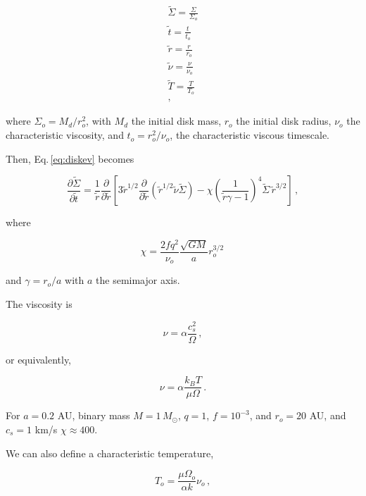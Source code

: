 \documentclass{article}
\begin{document}
\begin{align} 
\tilde{\Sigma} = \frac{\Sigma}{\Sigma_o}\\
\tilde{t} = \frac{t}{t_o}\\
\tilde{r} = \frac{r}{r_o}\\
\tilde{\nu} = \frac{\nu}{\nu_o}\\
\tilde{T} = \frac{T}{T_o}\\,
\end{align}

where $\Sigma_o = M_d/r_o^2$, with $M_d$ the initial disk mass, $r_o$ the initial disk radius, $\nu_o$ the characteristic viscosity, and $t_o = r_o^2/\nu_o$, the characteristic viscous timescale.

Then, Eq.\,\ref{eq:diskev} becomes

\begin{equation}
\frac{\partial \tilde{\Sigma}}{\partial \tilde{t}} = \frac{1}{\tilde{r}} \frac{\partial}{\partial \tilde{r}} \left[3 \tilde{r}^{1/2} \frac{\partial}{\partial \tilde{r}}  \left(\tilde{r}^{1/2} \tilde{\nu}\tilde{\Sigma} \right) - \chi\left(\frac{1}{\tilde{r}\gamma -1} \right)^4\tilde{\Sigma}\,\tilde{r}^{3/2}\right]\,,
\end{equation}

where

\begin{equation}
\chi = \frac{2 f q^2}{\nu_o} \frac{\sqrt{G M}}{a} r_o^{3/2}\,
\end{equation}

 and $\gamma = r_o/a$ with $a$ the semimajor axis. 
 
 The viscosity is 
 
 \begin{equation}
\nu = \alpha \frac{c_s^2}{\Omega}\,,
\end{equation}

or equivalently,

\begin{equation}
\nu = 	\alpha \frac{k_B T}{\mu \Omega}\,.
\end{equation}

For $a = 0.2$ AU, binary mass $M = 1\,M_{\odot}$, $q=1$, $f = 10^{-3}$, and $r_o = 20$ AU, and $c_s = 1$ km/s $\chi \approx 400$.

We can also define a characteristic temperature,

\begin{equation}
T_o = \frac{\mu \Omega_o}{\alpha k} \nu_o\,,
\end{equation}
\end{document}
